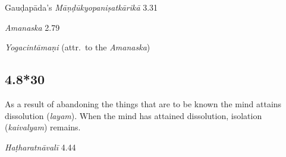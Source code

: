 \begin{ekdosis}
\begin{sources}[hp04_008_29]
Gauḍapāda's \emph{Māṇḍūkyopaniṣatkārikā} 3.31
\begin{versinnote}
\end{versinnote}

\emph{Amanaska} 2.79
\begin{versinnote}
\end{versinnote}
\end{sources}

\begin{testimonia}[hp04_008_29]
\emph{Yogacintāmaṇi} (attr.~to the \emph{Amanaska})
\begin{versinnote}
\end{versinnote}
\end{testimonia}


\subsection*{4.8*30}
\begin{translation}[hp04_008_30]
As a result of abandoning the things that are to be known the mind attains dissolution (\emph{layam}). When the mind has attained dissolution, isolation (\textit{kaivalyam}) remains.
\end{translation}

\begin{sources}[hp04_008_30]
\end{sources}

\begin{testimonia}[hp04_008_30]
\emph{Haṭharatnāvalī} 4.44
\begin{versinnote}
\end{versinnote}
\end{testimonia}


\end{ekdosis}
